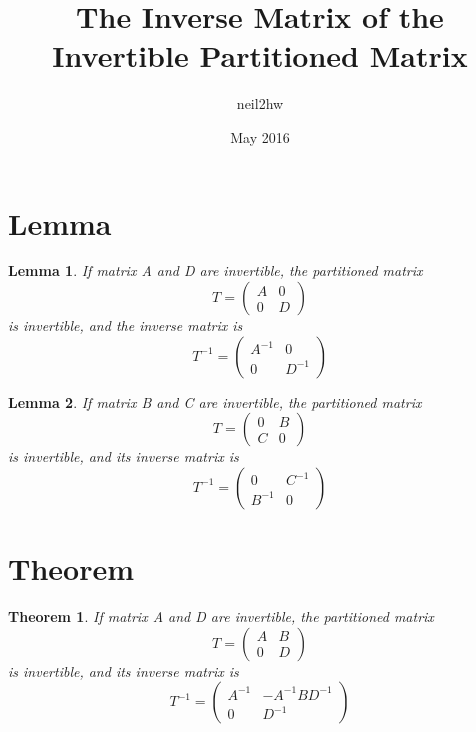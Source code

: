 \documentclass{article}
\title{The Inverse Matrix of the Invertible Partitioned Matrix}
\author{neil2hw}
\date{May 2016}
\newtheorem{lemma}{Lemma}
\newtheorem{theorem}{Theorem}
\begin{document}
\maketitle

\section{Lemma}

    \begin{lemma}
        If matrix A and D are invertible, the partitioned matrix
        $$
            T = 
            \begin{pmatrix}
                A & 0 \\
                0 & D
            \end{pmatrix}
        $$
        is invertible, and the inverse matrix is
        $$
            T^{-1} = 
            \begin{pmatrix}
                A^{-1} & 0 \\
                0 & D^{-1}
            \end{pmatrix}
        $$
    \end{lemma}
    
    \begin{lemma}
        If matrix B and C are invertible, the partitioned matrix
        $$
            T = 
            \begin{pmatrix}
                0 & B \\
                C & 0
            \end{pmatrix}
        $$
        is invertible, and its inverse matrix is
        $$
            T^{-1} = 
            \begin{pmatrix}
                0 & C^{-1} \\
                B^{-1} & 0
            \end{pmatrix}
        $$
    \end{lemma}
    
\section{Theorem}
    
    \begin{theorem}
        If matrix A and D are invertible, the partitioned matrix
        $$
            T = 
            \begin{pmatrix}
                A & B \\
                0 & D
            \end{pmatrix}
        $$
        is invertible, and its inverse matrix is
        $$
            T^{-1} = 
            \begin{pmatrix}
                A^{-1} & -A^{-1} B D^{-1} \\
                0 & D^{-1}
            \end{pmatrix}
        $$
    \end{theorem}
    
\end{document}
